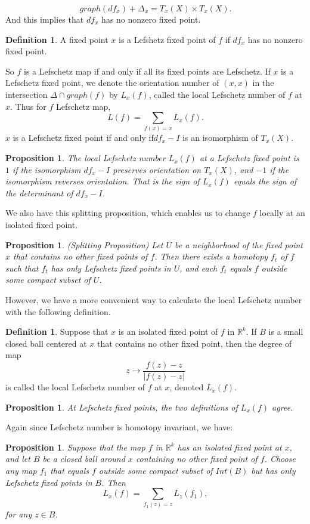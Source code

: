 \documentclass[psamsfonts]{amsart}
\newtheorem{prop}[theorem]{Proposition}
\theoremstyle{definition}
\newtheorem{defn}[theorem]{Definition}
\theoremstyle{remark}
\numberwithin{equation}{section}
\begin{document}
		\begin{equation}
			graph(df_x) + \Delta_x = T_x(X) \times T_x(X).
		\end{equation}
		And this implies that $df_x$ has no nonzero fixed point.
		\begin{defn}
			A fixed point $x$ is a Lefshetz fixed point of $f$ if $df_x$ has no nonzero fixed point.
		\end{defn}
		So $f$ is a Lefschetz map if and only if all its fixed points are Lefschetz. If $x$ is a Lefschetz fixed point, we denote the orientation number of $(x,x)$ in the intersection $\Delta \cap graph(f)$ by $L_x(f)$, called the local Lefschetz number of $f$ at $x$. Thus for $f$ Lefschetz map,
		\begin{equation}
			L(f) = \sum_{f(x)=x}L_x(f).
		\end{equation}
		$x$ is a Lefschetz fixed point if and only if$df_x - I$ is an isomorphism of $T_x(X)$.
		\begin{prop}
			The local Lefschetz number $L_x(f)$ at a Lefschetz fixed point is $1$ if the isomorphism $df_x-I$ preserves orientation on $T_x(X)$, and $-1$ if the isomorphism reverses orientation. That is the sign of $L_x(f)$ equals the sign of the determinant of $df_x - I$.
		\end{prop}
		We also have this splitting proposition, which enables us to change $f$ locally at an isolated fixed point.
		\begin{prop}(Splitting Proposition)
			Let $U$ be a neighborhood of the fixed point $x$ that contains no other fixed points of $f$. Then there exists a homotopy $f_t$ of $f$ such that $f_t$ has only Lefschetz fixed points in $U$, and each $f_t$ equals $f$ outside some compact subset of $U$.
		\end{prop}
		However, we have a more convenient way to calculate the local Lefschetz number with the following definition.
		\begin{defn}
			Suppose that $x$ is an isolated fixed point of $f$ in $\mathbb{R}^k$. If $B$ is a small closed ball centered at $x$ that contains no other fixed point, then the degree of map
			\begin{equation}
				z \to \frac{f(z)-z}{|f(z)-z|}
			\end{equation}
			is called the local Lefschetz number of $f$ at $x$, denoted $L_x(f)$.
		\end{defn}
		\begin{prop}
			At Lefschetz fixed points, the two definitions of $L_x(f)$ agree.
		\end{prop}
		Again since Lefschetz number is homotopy invariant, we have:
		\begin{prop}
			Suppose that the map $f$ in $\mathbb{R}^k$ has an isolated fixed point at $x$, and let $B$ be a closed ball around $x$ containing no other fixed point of $f$. Choose any map $f_1$ that equals $f$ outside some compact subset of $Int(B)$ but has only Lefschetz fixed points in $B$. Then
			\begin{equation}
				L_x(f) = \sum_{f_1(z)=z}L_z(f_1),
			\end{equation}
			for any $z \in B$.
		\end{prop}
		
\end{document}
